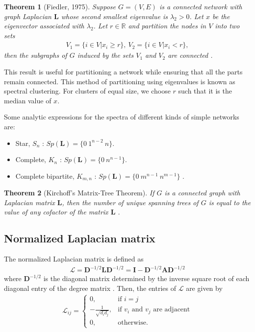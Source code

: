 \documentclass[10pt,a4paper]{article}
\newtheorem{thm}{Theorem}
\begin{document}
\begin{thm}[Fiedler, 1975]
	Suppose $G = (V,E)$ is a connected network with graph Laplacian $\mathbf{L}$ whose second smallest eigenvalue is $\lambda_2 > 0$. Let $x$ be the eigenvector associated with $\lambda_2$. Let $r \in \mathbb{R}$ and partition the nodes in $V$ into two sets
	\begin{eqnarray}
	V_1 = \{i \in V|x_i \geq r\}, ~ V_2 = \{i \in V | x_i < r\}, 
	\end{eqnarray}
	then the subgraphs of $G$ induced by the sets $V_1$ and $V_2$ are connected \citep{estrada2015first}.
	\label{fiedler}
\end{thm}
This result is useful for partitioning a network while ensuring that all the parts remain connected. This method of partitioning using eigenvalues is known as spectral clustering. For clusters of equal size, we choose $r$ such that it is the median value of $x$. 


Some analytic expressions for the spectra of different kinds of simple networks are:
\begin{itemize}
	\item Star, $S_n$ : $Sp(\mathbf{L}) = \{ 0~ 1^{n-2}~n\}$. 
	
	\item Complete, $K_n$ : $Sp(\mathbf{L}) = \{ 0~ n^{n-1} \}$. 
	
	\item Complete bipartite, $K_{m,n}$ : $Sp(\mathbf{L}) =\{ 0 ~ m^{n-1} ~ n^{m-1}\}$ \citep{estrada2011structure}.
	
\end{itemize}

\begin{thm}[Kirchoff's Matrix-Tree Theorem]
	If $G$ is a connected graph with Laplacian matrix $\mathbf{L}$, then the number of unique spanning trees of $G$ is equal to the value of any cofactor of the matrix $\mathbf{L}$ \citep{harris2008combinatorics}.
	\label{thm:kirchoff}
\end{thm}

\subsection{Normalized Laplacian matrix}
The normalized Laplacian matrix is defined as 
\begin{eqnarray*}
	\mathbf{\mathcal{L}} = \mathbf{D}^{-1/2} \mathbf{L} \mathbf{D}^{-1/2} = \mathbf{I} -\mathbf{D}^{-1/2} \mathbf{A} \mathbf{D}^{-1/2}
\end{eqnarray*}
where $\mathbf{D}^{-1/2}$ is the diagonal matrix determined by the inverse square root of each diagonal entry of the degree matrix \citep{estrada2011structure}. Then, the entries of $\mathbf{\mathcal{L}}$ are given by
\begin{eqnarray*}
	\mathcal{L}_{ij} = \begin{cases} 0, &\mbox{if } i = j \\
		- \frac{1}{\sqrt{d_i d_j}}, &\mbox{if } v_i \text{ and } v_j \text{ are adjacent} \\ 
		0, & \text{otherwise}.
	\end{cases}
\end{eqnarray*}
\end{document}
